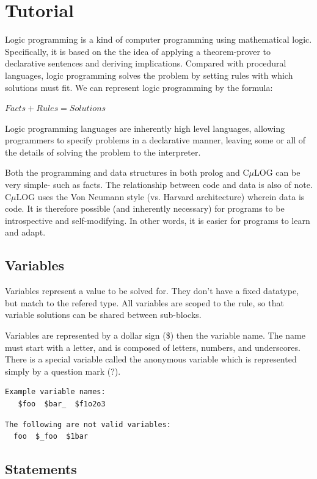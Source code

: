 \documentclass[onecolumn,titlepage]{article}
\begin{document}
\section{Tutorial}

Logic programming is a kind of computer programming using mathematical
logic. Specifically, it is based on the the idea of applying a
theorem-prover to declarative sentences and deriving
implications. Compared with procedural languages, logic programming
solves the problem by setting rules with which solutions must fit. We
can represent logic programming by the formula:

$Facts + Rules = Solutions$

Logic programming languages are inherently high level
languages, allowing programmers to specify problems in a declarative
manner, leaving some or all of the details of solving the problem to
the interpreter. 

Both the programming and data
structures in both prolog and C$\mu$LOG can be very simple- such as
facts. The relationship between code and data is also of note. C$\mu$LOG
uses the Von Neumann style (vs. Harvard architecture) wherein data is
code. It is therefore possible (and inherently necessary) for programs
to be introspective and self-modifying. In other words, it is easier
for programs to learn and adapt.


\subsection{Variables}
Variables represent a value to be solved for. They don't have a fixed
datatype, but match to the refered type. All variables are scoped to
the rule, so that variable solutions can be shared between sub-blocks.

Variables are represented by a dollar sign (\$) then the variable
name. The name must start with a letter, and is composed of letters,
numbers, and underscores. There is a special variable called the
anonymous variable which is represented simply by a question mark (?).


\begin{verbatim}
Example variable names:
   $foo  $bar_  $f1o2o3
\end{verbatim}

\begin{verbatim}
The following are not valid variables:
  foo  $_foo  $1bar
\end{verbatim}

\subsection{Statements}
\end{document}
